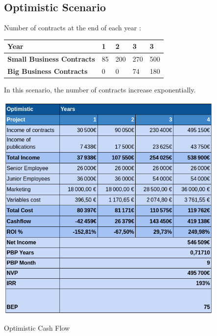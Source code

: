 \documentclass[./main.tex]{subfiles}
\begin{document}
\subsection{Optimistic Scenario}
Number of contracts at the end of each year : 
\begin{table}[]
\begin{tabular}{|l|l|l|l|l|}
\hline
\textbf{Year}                     & 1  & 2   & 3   & 3   \\ \hline
\textbf{Small Business Contracts} & 85 & 200 & 270 & 500 \\ \hline
\textbf{Big Business Contracts}   & 0  & 0   & 74  & 180 \\ \hline
\end{tabular}
\end{table}
In this scenario, the number of contracts increase exponentially.
\begin{table}[H]
	\centering
	\includegraphics[width=11.3cm]{optimistic.png}
	\caption{Optimistic Cash Flow}
	\label{tab:optimistic}
\end{table}
\end{document}
